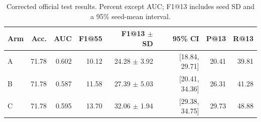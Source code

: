 \begin{table}[htbp]\centering\small
\caption{Corrected official test results. Percent except AUC; F1@13 includes seed SD and a 95\% seed-mean interval.}\label{tab:main}
\begin{tabular}{@{}lrrrrrrr@{}}\toprule
Arm & Acc. & AUC & F1@55 & F1@13 $\pm$ SD & 95\% CI & P@13 & R@13\\\midrule
A & 71.78 & 0.602 & 10.12 & 24.28 $\pm$ 3.92 & [18.84, 29.71] & 20.41 & 39.81\\
B & 71.78 & 0.587 & 11.58 & 27.39 $\pm$ 5.03 & [20.41, 34.36] & 26.31 & 41.28\\
C & 71.78 & 0.595 & 13.70 & 32.06 $\pm$ 1.94 & [29.38, 34.75] & 29.73 & 48.88\\
\bottomrule\end{tabular}\end{table}
